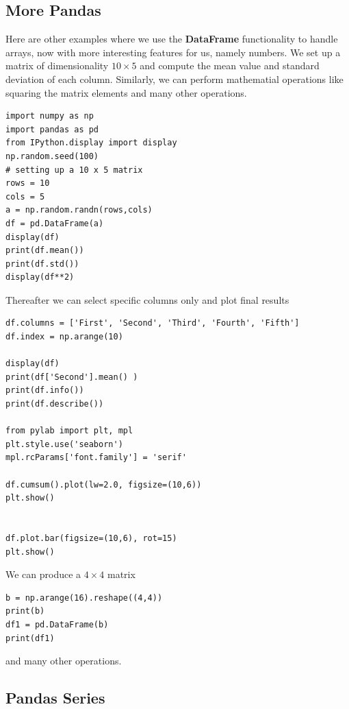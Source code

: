 \documentclass[%
oneside,                 %
final,                   %
10pt]{article}
\begin{document}
\subsection*{More  Pandas}

Here are other examples where we use the \textbf{DataFrame} functionality to handle arrays, now with more interesting features for us, namely numbers. We set up a matrix 
of dimensionality $10\times 5$ and compute the mean value and standard deviation of each column. Similarly, we can perform mathematial operations like squaring the matrix elements and many other operations. 
\begin{verbatim}
import numpy as np
import pandas as pd
from IPython.display import display
np.random.seed(100)
# setting up a 10 x 5 matrix
rows = 10
cols = 5
a = np.random.randn(rows,cols)
df = pd.DataFrame(a)
display(df)
print(df.mean())
print(df.std())
display(df**2)
\end{verbatim}

Thereafter we can select specific columns only and plot final results
\begin{verbatim}
df.columns = ['First', 'Second', 'Third', 'Fourth', 'Fifth']
df.index = np.arange(10)

display(df)
print(df['Second'].mean() )
print(df.info())
print(df.describe())

from pylab import plt, mpl
plt.style.use('seaborn')
mpl.rcParams['font.family'] = 'serif'

df.cumsum().plot(lw=2.0, figsize=(10,6))
plt.show()


df.plot.bar(figsize=(10,6), rot=15)
plt.show()
\end{verbatim}
We can produce a $4\times 4$ matrix
\begin{verbatim}
b = np.arange(16).reshape((4,4))
print(b)
df1 = pd.DataFrame(b)
print(df1)
\end{verbatim}
and many other operations. 


\subsection*{Pandas Series}
\end{document}
